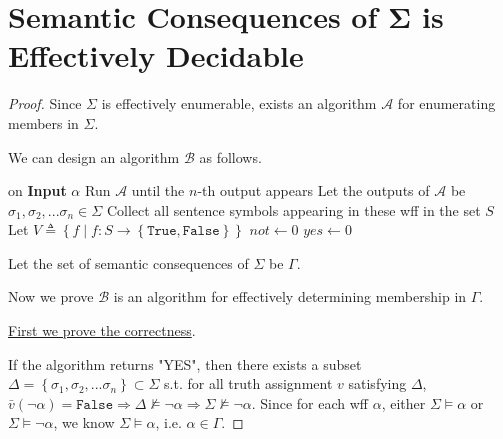 \documentclass{article}
\newcommand{\set}[1]{\left\{#1\right\}}
\begin{document}
\section{Semantic Consequences of $\boldsymbol{\Sigma}$ is Effectively Decidable}
\vspace{1em}
\begin{proof}
    Since $\Sigma$ is effectively enumerable, exists an algorithm $\mathcal{A}$ for enumerating members in $\Sigma$.
    
    \hspace{1.3em}
    We can design an algorithm $\mathcal{B}$ as follows.

    \vspace{-0.5em}
    \begin{algorithm}
        
	    {
	    on \textbf{Input} $\alpha$\;
        {
            Run $\mathcal{A}$ until the $n$-th output appears\;
            Let the outputs of $\mathcal{A}$ be $\sigma_1,\sigma_2,...\sigma_n\in\Sigma$\;
            Collect all sentence symbols appearing in these wff in the set $S$\;
            Let $V\triangleq\set{f\mid f:S\to\set{\mathtt{True},\mathtt{False}}}$\;
            $not\gets 0$\;
            $yes\gets 0$\;
            {
            }
        }
        }
    \end{algorithm}

    \hspace{1.3em}
    Let the set of semantic consequences of $\Sigma$ be $\Gamma$.

    \hspace{1.3em}
    Now we prove $\mathcal{B}$ is an algorithm for effectively determining membership in $\Gamma$.

    \hspace{1.3em}
    \underline{First we prove the correctness}.

    \hspace{1.3em}
    If the algorithm returns "YES", then there exists a subset $\Delta=\set{\sigma_1,\sigma_2,...\sigma_n}\subset\Sigma$ s.t. for all truth assignment $v$ satisfying $\Delta$, $\bar{v}(\neg\alpha)=\mathtt{False} \Longrightarrow \Delta\nvDash\neg\alpha \Longrightarrow\Sigma\nvDash\neg\alpha$. Since for each wff $\alpha$, either $\Sigma\vDash\alpha$ or $\Sigma\vDash\neg\alpha$, we know $\Sigma\vDash\alpha$, i.e. $\alpha\in\Gamma$.


\end{proof}
\end{document}
